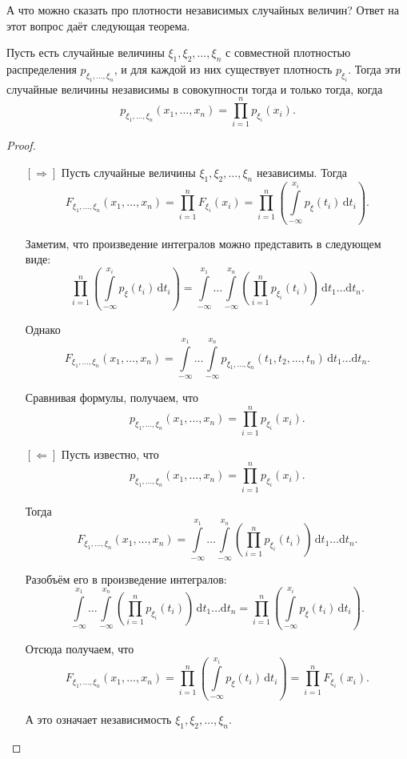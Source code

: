 А что можно сказать про плотности независимых случайных величин? Ответ на этот вопрос даёт следующая теорема.
\begin{theorem}
	Пусть есть случайные величины \(\xi_1, \xi_2, \dots, \xi_n\) с совместной плотностью распределения \(p_{\xi_1, \dots, \xi_n}\), и для каждой из них существует плотность \(p_{\xi_i}\). Тогда эти случайные величины независимы в совокупности тогда и только тогда, когда 
	\[
	p_{\xi_1, \dots, \xi_n}(x_1, \dots, x_n) = \prod\limits_{i = 1}^{n} p_{\xi_i}(x_i).
	\]
\end{theorem}
\begin{proof}\ 
	\begin{enumerate}
		\item[{\([\Rightarrow]\)}] Пусть случайные величины \(\xi_1, \xi_2, \dots, \xi_n\) независимы. Тогда
		\[
		F_{\xi_1, \dots, \xi_n}(x_1, \dots, x_n) = \prod\limits_{i = 1}^{n} F_{\xi_i}(x_i) = \prod\limits_{i = 1}^{n} \left(\int\limits_{-\infty}^{x_i} p_{\xi}(t_i)\,\mathrm{d}t_i\right).
		\]
		
		Заметим, что произведение интегралов можно представить в следующем виде:
		\[
		\prod\limits_{i = 1}^{n} \left(\int\limits_{-\infty}^{x_i} p_{\xi}(t_i)\,\mathrm{d}t_i\right) = \int\limits_{-\infty}^{x_1} \dots \int\limits_{-\infty}^{x_n} \left(\prod\limits_{i = 1}^{n} p_{\xi_i}(t_i)\right)\,\mathrm{d}t_1\dots\mathrm{d}t_n.
		\]
		
		Однако
		\[
		F_{\xi_1, \dots, \xi_n}(x_1, \dots, x_n) = \int\limits_{-\infty}^{x_1} \dots \int\limits_{-\infty}^{x_n} p_{\xi_1, \dots, \xi_n}(t_1, t_2, \dots, t_n)\,\mathrm{d}t_1\dots\mathrm{d}t_n.
		\]
		
		Сравнивая формулы, получаем, что
		\[
		p_{\xi_1, \dots, \xi_n}(x_1, \dots, x_n) = \prod\limits_{i = 1}^{n} p_{\xi_i}(x_i).
		\]
		
		\item[{\([\Leftarrow]\)}] Пусть известно, что
		\[
		p_{\xi_1, \dots, \xi_n}(x_1, \dots, x_n) = \prod\limits_{i = 1}^{n} p_{\xi_i}(x_i).
		\]
		
		Тогда
		\[
		F_{\xi_1, \dots, \xi_n}(x_1, \dots, x_n) = \int\limits_{-\infty}^{x_1} \dots \int\limits_{-\infty}^{x_n} \left(\prod\limits_{i = 1}^{n} p_{\xi_i}(t_i)\right)\,\mathrm{d}t_1\dots\mathrm{d}t_n.
		\]
		
		Разобъём его в произведение интегралов:
		\[
		\int\limits_{-\infty}^{x_1} \dots \int\limits_{-\infty}^{x_n} \left(\prod\limits_{i = 1}^{n} p_{\xi_i}(t_i)\right)\,\mathrm{d}t_1\dots\mathrm{d}t_n = \prod\limits_{i = 1}^{n} \left(\int\limits_{-\infty}^{x_i} p_{\xi}(t_i)\,\mathrm{d}t_i\right).
		\]
		
		Отсюда получаем, что
		\[
		F_{\xi_1, \dots, \xi_n}(x_1, \dots, x_n) = \prod\limits_{i = 1}^{n} \left(\int\limits_{-\infty}^{x_i} p_{\xi}(t_i)\,\mathrm{d}t_i\right) = \prod\limits_{i = 1}^{n} F_{\xi_i}(x_i).
		\]
		
		А это означает независимость \(\xi_1, \xi_2, \dots, \xi_n\).
	\end{enumerate}
\end{proof}

